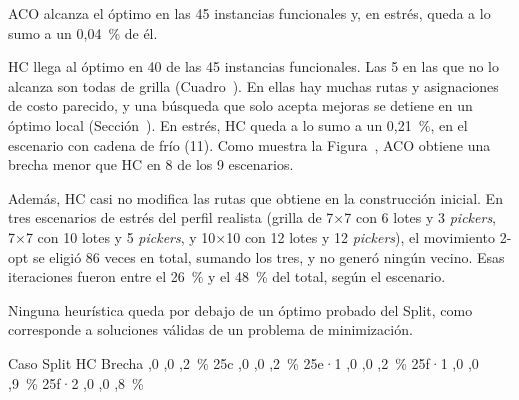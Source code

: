 ACO alcanza el óptimo en las 45 instancias funcionales y, en estrés, queda a
lo sumo a un 0,04~\% de él.

HC llega al óptimo en 40 de las 45 instancias
funcionales. Las 5 en las que no lo alcanza son todas de grilla
(Cuadro~). En ellas hay muchas rutas y asignaciones de
costo parecido, y una búsqueda que solo acepta mejoras se detiene en un
óptimo local (Sección~). En estrés, HC queda a lo
sumo a un 0,21~\%, en el escenario con cadena de frío (11). Como muestra la
Figura~, ACO obtiene una brecha menor que HC en 8 de los 9
escenarios.

Además, HC casi no modifica las rutas que obtiene en la construcción inicial. En tres
escenarios de estrés del perfil realista (grilla de 7×7 con 6 lotes y 3
{\em pickers}, 7×7 con 10 lotes y 5 {\em pickers}, y 10×10 con 12 lotes y
12 {\em pickers}), el movimiento 2-opt se eligió 86 veces en total, sumando los tres, y no
generó ningún vecino. Esas iteraciones fueron entre el 26~\% y el 48~\% del total, según
el escenario.

Ninguna heurística queda por debajo de un óptimo probado del
Split, como corresponde a soluciones válidas de un problema de minimización.

\startplacetable[reference=tab:res_fallos_hc, location=here, title={Instancias funcionales en las que HC no alcanza el óptimo. ACO lo alcanza en las cinco.}]
	\bTABLE[split=yes, align=middle, frame=on, width=fit]
	\setupTABLE[row][1][background=color, backgroundcolor=darkgray, style=bold]
	\setupTABLE[column][2,3,4][align=flushright]
	\bTR \bTH Caso \eTH \bTH Split \eTH \bTH HC \eTH \bTH Brecha \eTH \eTR
	\bTR {} \eTD {},0 \eTD {},0 \eTD {},2~\% \eTD \eTR
	\bTR \bTD 25c \eTD {},0 \eTD {},0 \eTD {},2~\% \eTD \eTR
	\bTR \bTD 25e·1 \eTD {},0 \eTD {},0 \eTD {},2~\% \eTD \eTR
	\bTR \bTD 25f·1 \eTD {},0 \eTD {},0 \eTD {},9~\% \eTD \eTR
	\bTR \bTD 25f·2 \eTD {},0 \eTD {},0 \eTD {},8~\% \eTD \eTR
	\eTABLE
\stopplacetable

